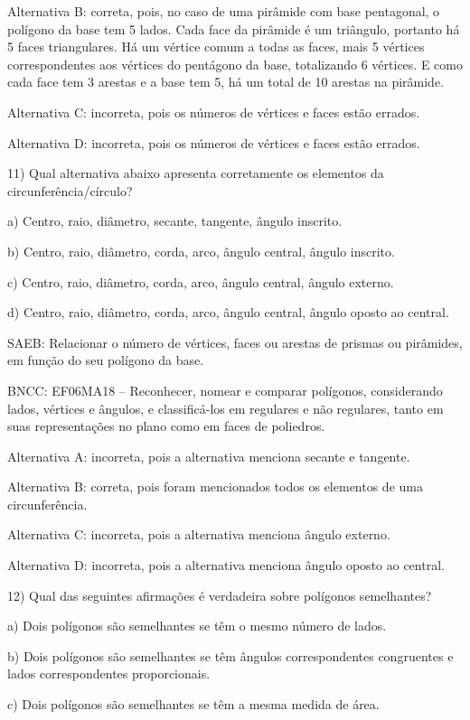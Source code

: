 Alternativa B: correta, pois, no caso de uma pirâmide com base
pentagonal, o polígono da base tem 5 lados. Cada face da pirâmide é um
triângulo, portanto há 5 faces triangulares. Há um vértice comum a todas
as faces, mais 5 vértices correspondentes aos vértices do pentágono da
base, totalizando 6 vértices. E como cada face tem 3 arestas e a base
tem 5, há um total de 10 arestas na pirâmide.

Alternativa C: incorreta, pois os números de vértices e faces estão
errados.

Alternativa D: incorreta, pois os números de vértices e faces estão
errados.

11) Qual alternativa abaixo apresenta corretamente os elementos da
circunferência/círculo?

a) Centro, raio, diâmetro, secante, tangente, ângulo inscrito.

b) Centro, raio, diâmetro, corda, arco, ângulo central, ângulo inscrito.

c) Centro, raio, diâmetro, corda, arco, ângulo central, ângulo externo.

d) Centro, raio, diâmetro, corda, arco, ângulo central, ângulo oposto ao
central.

SAEB: Relacionar o número de vértices, faces ou arestas de prismas ou
pirâmides, em função do seu polígono da base.

BNCC: EF06MA18 -- Reconhecer, nomear e comparar polígonos, considerando
lados, vértices e ângulos, e classificá-los em regulares e não
regulares, tanto em suas representações no plano como em faces de
poliedros.

Alternativa A: incorreta, pois a alternativa menciona secante e
tangente.

Alternativa B: correta, pois foram mencionados todos os elementos de uma
circunferência.

Alternativa C: incorreta, pois a alternativa menciona ângulo externo.

Alternativa D: incorreta, pois a alternativa menciona ângulo oposto ao
central.

12) Qual das seguintes afirmações é verdadeira sobre polígonos
semelhantes?

a) Dois polígonos são semelhantes se têm o mesmo número de lados.

b) Dois polígonos são semelhantes se têm ângulos correspondentes
congruentes e lados correspondentes proporcionais.

c) Dois polígonos são semelhantes se têm a mesma medida de área.

